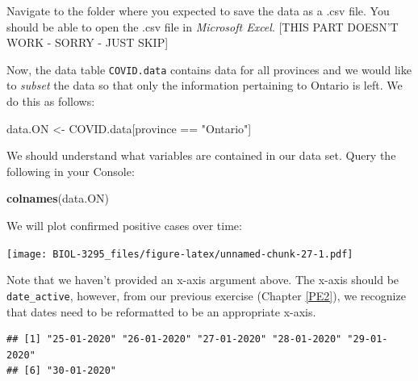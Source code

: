 \documentclass[]{book}
\newenvironment{Shaded}{\begin{snugshade}}{\end{snugshade}}
\newcommand{\KeywordTok}[1]{\textcolor[rgb]{0.13,0.29,0.53}{\textbf{{#1}}}}
\newcommand{\DataTypeTok}[1]{\textcolor[rgb]{0.13,0.29,0.53}{{#1}}}
\newcommand{\StringTok}[1]{\textcolor[rgb]{0.31,0.60,0.02}{{#1}}}
\newcommand{\NormalTok}[1]{{#1}}
\begin{document}
Navigate to the folder where you expected to save the data as a .csv
file. You should be able to open the .csv file in \emph{Microsoft
Excel}. {[}THIS PART DOESN'T WORK - SORRY - JUST SKIP{]}

Now, the data table \texttt{COVID.data} contains data for all provinces
and we would like to \emph{subset} the data so that only the information
pertaining to Ontario is left. We do this as follows:

\begin{Shaded}
\begin{Highlighting}[]
\NormalTok{data.ON <-}\StringTok{ }\NormalTok{COVID.data[province ==}\StringTok{ "Ontario"}\NormalTok{]}
\end{Highlighting}
\end{Shaded}

We should understand what variables are contained in our data set. Query
the following in your Console:

\begin{Shaded}
\begin{Highlighting}[]
\KeywordTok{colnames}\NormalTok{(data.ON)}
\end{Highlighting}
\end{Shaded}

We will plot confirmed positive cases over time:

\begin{Shaded}
\end{Shaded}

\texttt{[image: BIOL-3295\_files/figure-latex/unnamed-chunk-27-1.pdf]}

Note that we haven't provided an x-axis argument above. The x-axis
should be \texttt{date\_active}, however, from our previous exercise
(Chapter \ref{PE2}), we recognize that dates need to be reformatted to
be an appropriate x-axis.

\begin{Shaded}
\end{Shaded}

\begin{verbatim}
## [1] "25-01-2020" "26-01-2020" "27-01-2020" "28-01-2020" "29-01-2020"
## [6] "30-01-2020"
\end{verbatim}
\end{document}
